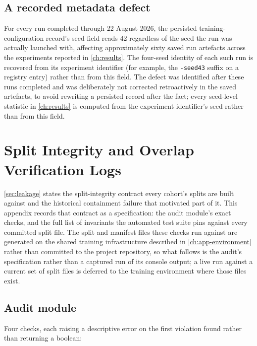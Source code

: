 \section*{A recorded metadata defect}

For every run completed through 22 August 2026, the persisted training-configuration
record's seed field reads 42 regardless of the seed the run was actually launched with,
affecting approximately sixty saved run artefacts across the experiments reported in
\autoref{ch:results}. The four-seed identity of each such run is recovered from its
experiment identifier (for example, the \texttt{-seed43} suffix on a registry entry) rather
than from this field. The defect was identified after these runs completed and was
deliberately not corrected retroactively in the saved artefacts, to avoid rewriting a
persisted record after the fact; every seed-level statistic in \autoref{ch:results} is
computed from the experiment identifier's seed rather than from this field.

\chapter{Split Integrity and Overlap Verification Logs}\label{ch:app-splits}

\autoref{sec:leakage} states the split-integrity contract every cohort's splits are built
against and the historical containment failure that motivated part of it. This appendix
records that contract as a specification: the audit module's exact checks, and the full
list of invariants the automated test suite pins against every committed split file. The
split and manifest files these checks run against are generated on the shared training
infrastructure described in \autoref{ch:app-environment} rather than committed to the
project repository, so what follows is the audit's specification rather than a captured
run of its console output; a live run against a current set of split files is deferred to
the training environment where those files exist.

\section*{Audit module}

Four checks, each raising a descriptive error on the first violation found rather than
returning a boolean:

